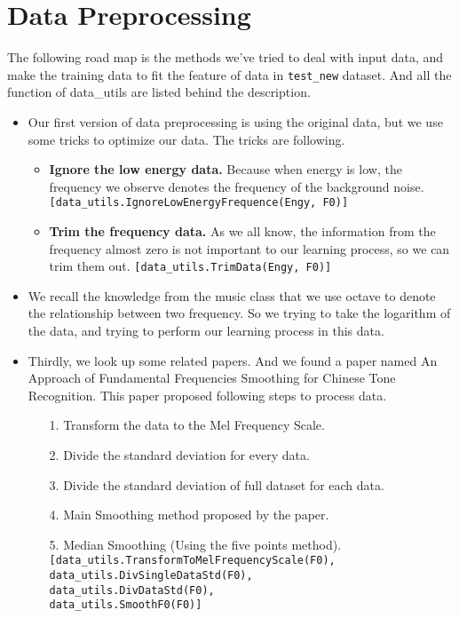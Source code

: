 \documentclass[12pt]{article}
\begin{document}
\section{Data Preprocessing}
The following road map is the methods we've tried to deal with input data, and make the training data to fit the feature of data in \texttt{test\_new} dataset. And all the function of data\_utils are listed behind the description.
\begin{itemize}
	\item Our first version of data preprocessing is using the original data, but we use some tricks to optimize our data. The tricks are following.
	\begin{itemize}
		\item {\bf Ignore the low energy data.} Because when energy is low, the frequency we observe denotes the frequency of the background noise.\\
		\texttt{[data\_utils.IgnoreLowEnergyFrequence(Engy, F0)]}
		\item {\bf Trim the frequency data.} As we all know, the information from the frequency almost zero is not important to our learning process, so we can trim them out.
		\texttt{[data\_utils.TrimData(Engy, F0)]}
	\end{itemize}
	\item We recall the knowledge from the music class that we use octave to denote the relationship between two frequency. So we trying to take the logarithm of the data, and trying to perform our learning process in this data.
	\item Thirdly, we look up some related papers. And we found a paper named An Approach of Fundamental Frequencies Smoothing for Chinese Tone Recognition. This paper proposed following steps to process data.
	\begin{itemize}
		\item[1.] Transform the data to the Mel Frequency Scale.
		\item[2.] Divide the standard deviation for every data.
		\item[3.] Divide the standard deviation of full dataset for each
data.
		\item[4.] Main Smoothing method proposed by the paper.
		\item[5.] Median Smoothing (Using the five points method).\\
		\texttt{[data\_utils.TransformToMelFrequencyScale(F0),\\
		data\_utils.DivSingleDataStd(F0),\\
		data\_utils.DivDataStd(F0),\\
		data\_utils.SmoothF0(F0)]}
		

\end{itemize}
\end{itemize}
\end{document}
